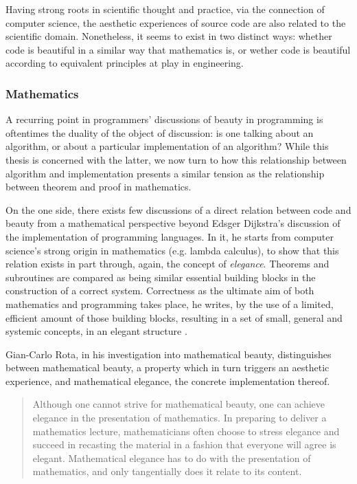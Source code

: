 Having strong roots in scientific thought and practice, via the connection of computer science, the aesthetic experiences of source code are also related to the scientific domain. Nonetheless, it seems to exist in two distinct ways: whether code is beautiful in a similar way that mathematics is, or wether code is beautiful according to equivalent principles at play in engineering.

\subsubsection{Mathematics}
\label{subsubsec:beauty-mathematics}

A recurring point in programmers' discussions of beauty in programming is oftentimes the duality of the object of discussion: is one talking about an algorithm, or about a particular implementation of an algorithm? While this thesis is concerned with the latter, we now turn to how this relationship between algorithm and implementation presents a similar tension as the relationship between theorem and proof in mathematics.

On the one side, there exists few discussions of a direct relation between code and beauty from a mathematical perspective beyond Edsger Dijkstra's discussion of the implementation of programming languages. In it, he starts from computer science's strong origin in mathematics (e.g. lambda calculus), to show that this relation exists in part through, again, the concept of \emph{elegance}. Theorems and subroutines are compared as being similar essential building blocks in the construction of a correct system. Correctness as the ultimate aim of both mathematics and programming takes place, he writes, by the use of a limited, efficient amount of those building blocks, resulting in a set of small, general and systemic concepts, in an elegant structure \citep{dijkstra_design_1963}.

Gian-Carlo Rota, in his investigation into mathematical beauty, distinguishes between mathematical beauty, a property which in turn triggers an aesthetic experience, and mathematical elegance, the concrete implementation thereof.

\begin{quote}
  Although one cannot strive for mathematical beauty, one can achieve elegance in the presentation of mathematics. In preparing to deliver a mathematics lecture, mathematicians often choose to stress elegance and succeed in recasting the material in a fashion that everyone will agree is elegant. Mathematical elegance has to do with the presentation of mathematics, and only tangentially does it relate to its content. \citep{rota_phenomenology_1997}
\end{quote}

